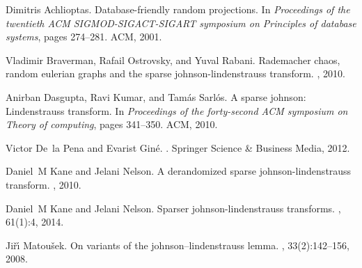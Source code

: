 \documentclass[11pt]{article}
\begin{document}



\begin{thebibliography}{DlPG12}

Dimitris Achlioptas.
\newblock Database-friendly random projections.
\newblock In {\em Proceedings of the twentieth ACM SIGMOD-SIGACT-SIGART
  symposium on Principles of database systems}, pages 274--281. ACM, 2001.

Vladimir Braverman, Rafail Ostrovsky, and Yuval Rabani.
\newblock Rademacher chaos, random eulerian graphs and the sparse
  johnson-lindenstrauss transform.
, 2010.

Anirban Dasgupta, Ravi Kumar, and Tam{\'a}s Sarl{\'o}s.
\newblock A sparse johnson: Lindenstrauss transform.
\newblock In {\em Proceedings of the forty-second ACM symposium on Theory of
  computing}, pages 341--350. ACM, 2010.

Victor De~la Pena and Evarist Gin{\'e}.
.
\newblock Springer Science \& Business Media, 2012.

Daniel~M Kane and Jelani Nelson.
\newblock A derandomized sparse johnson-lindenstrauss transform.
, 2010.

Daniel~M Kane and Jelani Nelson.
\newblock Sparser johnson-lindenstrauss transforms.
, 61(1):4, 2014.

Ji{\v{r}}{\'\i} Matou{\v{s}}ek.
\newblock On variants of the johnson--lindenstrauss lemma.
, 33(2):142--156, 2008.

\end{thebibliography}
\end{document}
